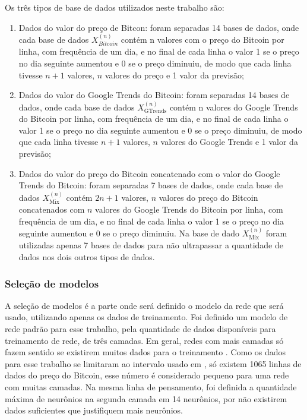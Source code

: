 Os três tipos de base de dados utilizados neste trabalho são:
\begin{enumerate}

    \item Dados do valor do preço de Bitcon: foram separadas 14 bases de dados, onde cada base de dados $X_{Bitcoin}^{(n)}$ contém n valores com o preço do Bitcoin por linha, com frequência de um dia, e no final de cada linha o valor 1 se o preço no dia seguinte aumentou e 0 se o preço diminuiu, de modo que cada linha tivesse $n+1$ valores, $n$ valores do preço e 1 valor da previsão;
    
    \item Dados do valor do Google Trends do Bitcoin: foram separadas 14 bases de dados, onde cada base de dados $X_{\text{GTrends}}^{(n)}$ contém n valores do Google Trends do Bitcoin por linha, com frequência de um dia, e no final de cada linha o valor 1 se o preço no dia seguinte aumentou e 0 se o preço diminuiu, de modo que cada linha tivesse $n+1$ valores, $n$ valores do Google Trends e 1 valor da previsão;
    
    \item Dados do valor do preço do Bitcoin concatenado com o valor do Google Trends do Bitcoin: foram separadas 7 bases de dados, onde cada base de dados $X_{\text{Mix}}^{(n)}$ contém $2n+1$ valores, $n$ valores do preço do Bitcoin concatenados com $n$ valores do Google Trends do Bitcoin por linha, com frequência de um dia, e no final de cada linha o valor 1 se o preço no dia seguinte aumentou e 0 se o preço diminuiu. Na base de dado $X_{\text{Mix}}^{(n)}$ foram utilizadas apenas 7 bases de dados para não ultrapassar a quantidade de dados nos dois outros tipos de dados.
    
\end{enumerate}

\subsubsection{Seleção de modelos}
\label{sec:meto0}

 A seleção de modelos é a parte onde será definido o modelo da rede que será usado, utilizando apenas os dados de treinamento. Foi definido um modelo de rede padrão para esse trabalho, pela quantidade de dados disponíveis para treinamento de rede, de três camadas. Em geral, redes com mais camadas só fazem sentido se existirem muitos dados para o treinamento \cite{lecun2015deep,chen2014big, najafabadi2015deep}. Como os dados para esse trabalho se limitaram ao intervalo usado em \cite{mcnally2016predicting}, só existem 1065 linhas de dados do preço do Bitcoin, esse número é considerado pequeno para uma rede com muitas camadas. Na mesma linha de pensamento, foi definida a quantidade máxima de neurônios na segunda camada em 14 neurônios, por não existirem dados suficientes que justifiquem mais neurônios.
 
